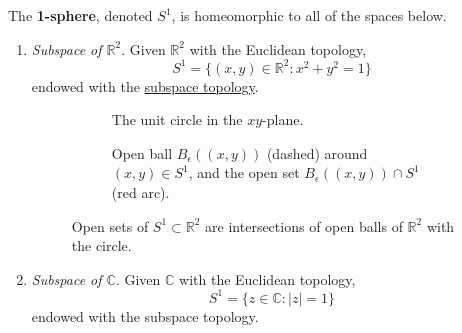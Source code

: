 	\begin{definition}
	  \label{def:constructions-of-the-circle-s1}
		The \textbf{1-sphere}, denoted $S^1$, is homeomorphic to all of the spaces below. 
		\begin{enumerate}
			\item \textit{Subspace of $\mathbb{R}^2$}. Given $\mathbb{R}^2$ with the Euclidean topology, 
				\begin{equation}
					S^1 = \{(x, y) \in \mathbb{R}^2 \colon x^2 + y^2 = 1 \}
				\end{equation}
				endowed with the \hyperref[def:subspace-topology]{subspace topology}. 

					\begin{figure}[H]
					\centering
					\begin{subfigure}[t]{0.48\textwidth}
						\centering
						\caption{The unit circle in the $xy$-plane.}
						\label{fig:s1_r2_circle}
					\end{subfigure}
					\hfill
					\begin{subfigure}[t]{0.48\textwidth}
						\centering
						\caption{Open ball $B_\epsilon((x, y))$ (dashed) around $(x, y) \in S^1$, and the open set $B_\epsilon((x, y)) \cap S^1$ (red arc).}
						\label{fig:s1_r2_open}
					\end{subfigure}
					\caption{Open sets of $S^1 \subset \mathbb{R}^2$ are intersections of open balls of $\mathbb{R}^2$ with the circle.}
					\label{fig:s1_r2}
					\end{figure}

			\item \textit{Subspace of $\mathbb{C}$}. Given $\mathbb{C}$ with the Euclidean topology, 
				\begin{equation}
					S^1 = \{z \in \mathbb{C} \colon |z| = 1 \} 
				\end{equation}
				endowed with the subspace topology. 


\end{enumerate}
\end{definition}
